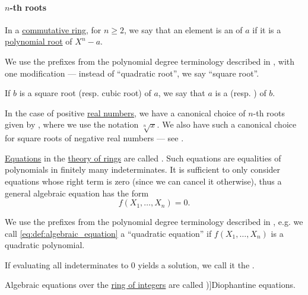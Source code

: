 \paragraph{\( n \)-th roots}

\begin{definition}\label{def:nth_root}\mimprovised
  In a \hyperref[def:ring/commutative]{commutative ring}, for \( n \geq 2 \), we say that an element is an  of \( a \) if it is a \hyperref[def:root_of_polynomial]{polynomial root} of \( X^n - a \).

  We use the prefixes from the polynomial degree terminology described in , with one modification --- instead of \enquote{quadratic root}, we say \enquote{square root}.

  If \( b \) is a square root (resp. cubic root) of \( a \), we say that \( a \) is a  (resp. ) of \( b \).
\end{definition}
\begin{comments}
  \item In the case of positive \hyperref[def:real_numbers]{real numbers}, we have a canonical choice of \( n \)-th roots given by , where we use the notation \( \sqrt[n]{ x } \). We also have such a canonical choice for square roots of negative real numbers --- see .
\end{comments}

\begin{definition}\label{def:algebraic_equation}\mimprovised
  \hyperref[def:first_order_equation]{Equations} in the \hyperref[def:ring/theory]{theory of rings} are called . Such equations are equalities of polynomials in finitely many indeterminates. It is sufficient to only consider equations whose right term is zero (since we can cancel it otherwise), thus a general algebraic equation has the form
  \begin{equation*}\label{eq:def:algebraic_equation}
    f(X_1, \ldots, X_n) = 0.
  \end{equation*}

  We use the prefixes from the polynomial degree terminology described in , e.g. we call \eqref{eq:def:algebraic_equation} a \enquote{quadratic equation} if \( f(X_1, \ldots, X_n) \) is a quadratic polynomial.

  \begin{thmenum}
     If evaluating all indeterminates to \( 0 \) yields a solution, we call it the .

     Algebraic equations over the \hyperref[def:ring_of_integers]{ring of integers} are called \term[ru=Диофантово уравнение (\cite[\S 1.9]{ШеньВерещагин2017Вычислимость})]{Diophantine equations}.
  \end{thmenum}
\end{definition}


